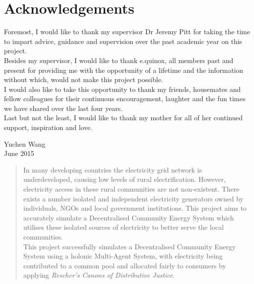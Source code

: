 \documentclass[11pt,a4paper,twoside]{memoir} %
\begin{document}
\frontmatter %


\section*{Acknowledgements}
Foremost, I would like to thank my supervisor Dr Jeremy Pitt for taking the time to impart advice, guidance and supervision over the past academic year on this project. \\ 
Besides my supervisor, I would like to thank e.quinox, all members past and present for providing me with the opportunity of a lifetime and the information without which, would not make this project possible. \\
I would also like to take this opportunity to thank my friends, housemates and fellow colleagues for their continuous encouragement, laughter and the fun times we have shared over the last four years. \\
Last but not the least, I would like to thank my mother for all of her continued support, inspiration and love.

\begin{flushright}
Yuchen Wang\\
June 2015
\end{flushright}

\cleartoverso %


\begin{abstract}

In many developing countries the electricity grid network is underdeveloped, causing low levels of rural electrification. However, electricity access in these rural communities are not non-existent. There exists a number isolated and independent electricity generators owned by individuals, NGOs and local government institutions. This project aims to accurately simulate a Decentralised Community Energy System which utilises these isolated sources of electricity to better serve the local communities. \\
\indent This project successfully simulates a Decentralised Community Energy System using a holonic Multi-Agent System, with electricity being contributed to a common pool and allocated fairly to consumers by applying \textit{Rescher's Canons of Distributive Justice}.  \\
\end{abstract}
\end{document}
